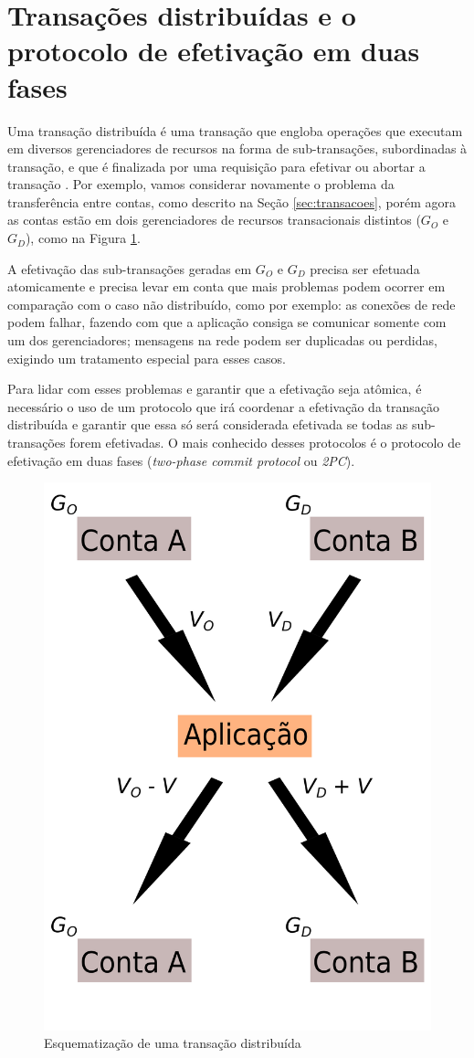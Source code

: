 \documentclass[11pt,twoside,a4paper]{book}
\begin{document}
\section{Transações distribuídas e o protocolo de efetivação em duas fases}
\label{sec:transacoes_distribuidas}
\label{sec:2pc}
Uma transação distribuída é uma transação que engloba operações que executam em diversos gerenciadores de recursos na forma de sub-transações, 
subordinadas à transação, e que é finalizada por uma requisição para efetivar ou
abortar a transação \cite{gray-lamport}. Por exemplo, vamos considerar
novamente o problema da transferência entre contas, como descrito na Seção \ref{sec:transacoes}, porém agora as contas estão em dois 
gerenciadores de recursos transacionais distintos ($G_O$ e $G_D$), como na Figura \ref{fig:transacao_distribuida}.

A efetivação das sub-transações geradas em $G_O$ e $G_D$ precisa ser efetuada
atomicamente e precisa levar em conta que mais problemas podem ocorrer em
comparação com o caso não distribuído, como por exemplo: as conexões de rede
podem falhar, fazendo com que a aplicação consiga se comunicar somente com um dos gerenciadores; mensagens na rede podem ser duplicadas ou 
perdidas, exigindo um tratamento especial para esses casos.

Para lidar com esses problemas e garantir que a efetivação seja atômica, é necessário o uso de um protocolo que irá coordenar a efetivação da 
transação distribuída e garantir que essa só será considerada efetivada se todas as sub-transações forem efetivadas. O mais conhecido desses 
protocolos é o protocolo de efetivação em duas fases (\emph{two-phase commit protocol} ou \emph{2PC}).

\begin{figure}
  \centering
  \includegraphics[width=.40\textwidth]{transacao_distribuida} 
  \caption{Esquematização de uma transação distribuída}
  \label{fig:transacao_distribuida} 
\end{figure}
\end{document}
